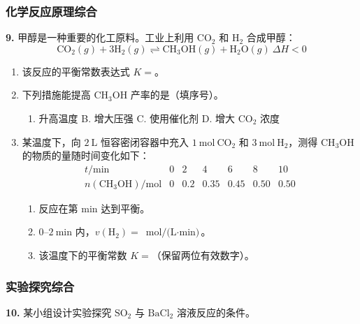 \subsubsection{化学反应原理综合}

\textbf{9.} 甲醇是一种重要的化工原料。工业上利用 $\text{CO}_2$ 和 $\text{H}_2$ 合成甲醇：
\[
\text{CO}_2(g) + 3\text{H}_2(g) \rightleftharpoons \text{CH}_3\text{OH}(g) + \text{H}_2\text{O}(g)\ \Delta H < 0
\]

\begin{enumerate}
  \item 该反应的平衡常数表达式 $K =$\underline{\qquad\qquad}。
  \item 下列措施能提高 $\text{CH}_3\text{OH}$ 产率的是\underline{\qquad\qquad}（填序号）。
  \begin{enumerate}
    \item[A.] 升高温度 \quad B. 增大压强 \quad C. 使用催化剂 \quad D. 增大 $\text{CO}_2$ 浓度
  \end{enumerate}
  \item 某温度下，向 $2\ \text{L}$ 恒容密闭容器中充入 $1\ \text{mol}\ \text{CO}_2$ 和 $3\ \text{mol}\ \text{H}_2$，测得 $\text{CH}_3\text{OH}$ 的物质的量随时间变化如下：
  \[
  \begin{array}{c|cccccc}
  t/\text{min} & 0 & 2 & 4 & 6 & 8 & 10 \\ \hline
  n(\text{CH}_3\text{OH})/\text{mol} & 0 & 0.2 & 0.35 & 0.45 & 0.50 & 0.50
  \end{array}
  \]
  \begin{enumerate}
    \item 反应在第\underline{\qquad\qquad} $\text{min}$ 达到平衡。
    \item $0\text{--}2\ \text{min}$ 内，$v(\text{H}_2) =$\underline{\qquad\qquad} $\text{mol/(L}\cdot\text{min)}$。
    \item 该温度下的平衡常数 $K =$\underline{\qquad\qquad}（保留两位有效数字）。
  \end{enumerate}
\end{enumerate}

\subsubsection{实验探究综合}

\textbf{10.} 某小组设计实验探究 $\text{SO}_2$ 与 $\text{BaCl}_2$ 溶液反应的条件。

